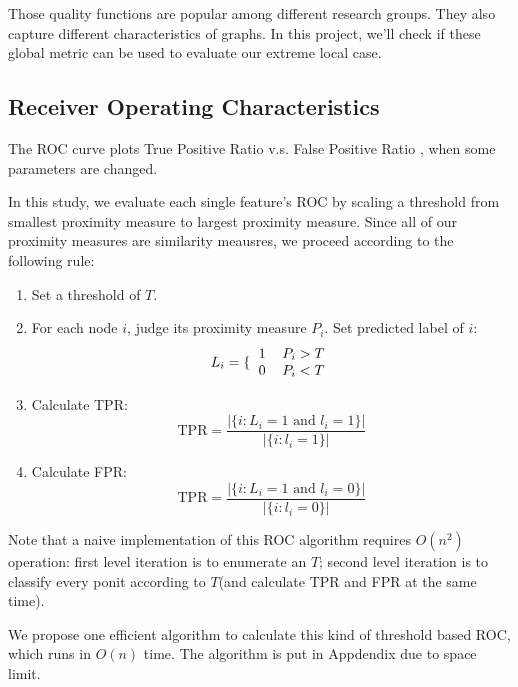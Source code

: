\documentclass[11pt,a4paper]{article}
\begin{document}
	Those quality functions are popular among different research 
	groups. They also capture different characteristics of graphs. 
	In this project, we'll check if these global metric can 
	be used to evaluate our extreme local case. 


\subsection{Receiver Operating Characteristics}

The ROC curve plots True Positive Ratio v.s. False Positive Ratio
\cite{wiki_roc}, when some parameters are changed. 

In this study, we evaluate each single feature's ROC by scaling 
a threshold from smallest proximity measure to largest proximity 
measure. Since all of our proximity measures are similarity 
meausres, we proceed according to the following rule:
\begin{enumerate}
	\item Set a threshold of $T$. 
	\item For each node $i$, judge its proximity measure $P_i$. 
	Set predicted label of $i$:
	\begin{equation}
		L_i = \lbrace{
			\begin{tabular}{cc}
				$1$ & $P_i > T$ \\
				$0$ & $P_i < T$ 
			\end{tabular}		
		}
	\end{equation}
	\item Calculate TPR:
	\begin{equation}
		\text{TPR} = \frac{|\{i:L_i=1 \text{ and } l_i=1\}|}{|\{i:l_i=1\}|}
	\end{equation}
	\item Calculate FPR:
	\begin{equation}
		\text{TPR} = \frac{|\{i:L_i=1 \text{ and } l_i=0\}|}{|\{i:l_i=0\}|}
	\end{equation}
\end{enumerate}

Note that a naive implementation of this ROC algorithm requires 
$O(n^2)$ operation: first level iteration is to enumerate an $T$;
second level iteration is to classify every ponit according to 
$T$(and calculate TPR and FPR at the same time).

We propose one efficient algorithm to calculate this kind of 
threshold based ROC, which runs in $O(n)$ time. The algorithm 
is put in Appdendix due to space limit. 
\end{document}
